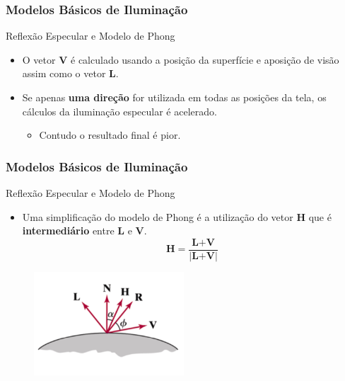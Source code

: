 \documentclass{beamer}
\begin{document}
\begin{frame}
\frametitle{Modelos Básicos de Iluminação}

	\begin{block}{Reflexão Especular e Modelo de Phong}
		\begin{itemize}
			\item O vetor \textbf{V} é calculado usando a posição da superfície e aposição de visão assim como o vetor \textbf{L}.
			\item Se apenas \textbf{uma direção} for utilizada em todas as posições da tela, os cálculos da iluminação especular é acelerado.
			\begin{itemize}
				\item Contudo o resultado final é pior.
			\end{itemize}
		\end{itemize}
	\end{block}
\end{frame}


\begin{frame}
\frametitle{Modelos Básicos de Iluminação}

	\begin{block}{Reflexão Especular e Modelo de Phong}
		\begin{itemize}
			\item Uma simplificação do modelo de Phong é a utilização do vetor \textbf{H} que é \textbf{intermediário} entre \textbf{L} e \textbf{V}.
			\begin{equation*}
				\textbf{H} = \frac{\textbf{L+V}}{|\textbf{L+V}|}
			\end{equation*}
		\end{itemize}
	\end{block}
	
	\begin{figure}[!h]
		\begin{center}
		\includegraphics[width=0.5\textwidth]{Figures/VecH}
		\end{center}
	\end{figure}	
\end{frame}
\end{document}
